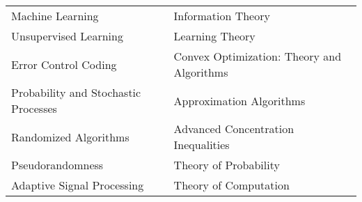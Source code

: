 \documentclass[margin, 11pt]{res} %
\begin{document}
\begin{resume}
\setlength\tabcolsep{15pt}
\begin{tabular}{ll}
	Machine Learning & Information Theory \\
	Unsupervised Learning & Learning Theory \\ 
	Error Control Coding & Convex Optimization: Theory and Algorithms\\
	Probability and Stochastic Processes & Approximation Algorithms \\ 
	Randomized Algorithms &  Advanced Concentration Inequalities\\
	Pseudorandomness & Theory of Probability \\
	Adaptive Signal Processing & Theory of Computation \\
\end{tabular}




\end{resume}
\end{document}

